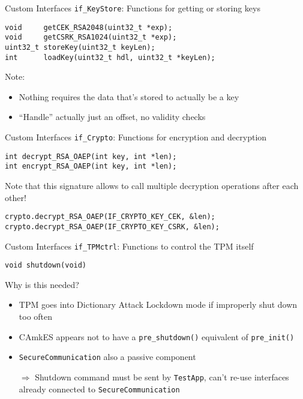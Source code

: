 \begin{frame}[fragile]{Custom Interfaces}
\texttt{if\_KeyStore}: Functions for getting or storing keys

\begin{verbatim}
void     getCEK_RSA2048(uint32_t *exp);
void     getCSRK_RSA1024(uint32_t *exp);
uint32_t storeKey(uint32_t keyLen);
int      loadKey(uint32_t hdl, uint32_t *keyLen);
\end{verbatim}

Note:
\begin{itemize}
\item Nothing requires the data that's stored to actually be a key
\item ``Handle'' actually just an offset, no validity checks
\end{itemize}
\end{frame}

\begin{frame}[fragile]{Custom Interfaces}
\texttt{if\_Crypto}: Functions for encryption and decryption

\begin{verbatim}
int decrypt_RSA_OAEP(int key, int *len);
int encrypt_RSA_OAEP(int key, int *len);
\end{verbatim}

Note that this signature allows to call multiple decryption operations after each other!

\begin{verbatim}
crypto.decrypt_RSA_OAEP(IF_CRYPTO_KEY_CEK, &len);
crypto.decrypt_RSA_OAEP(IF_CRYPTO_KEY_CSRK, &len);
\end{verbatim}
\end{frame}

\begin{frame}[fragile]{Custom Interfaces}
\texttt{if\_TPMctrl}: Functions to control the TPM itself

\begin{verbatim}
void shutdown(void)
\end{verbatim}

Why is this needed?

\begin{itemize}
\item TPM goes into Dictionary Attack Lockdown mode if improperly shut down too often
\item CAmkES appears not to have a \texttt{pre\_shutdown()} equivalent of \texttt{pre\_init()}
\item \texttt{SecureCommunication} also a passive component\\
\item[$\Rightarrow$] Shutdown command must be sent by \texttt{TestApp}, can't re-use interfaces already connected to \texttt{SecureCommunication}
\end{itemize}
\end{frame}

